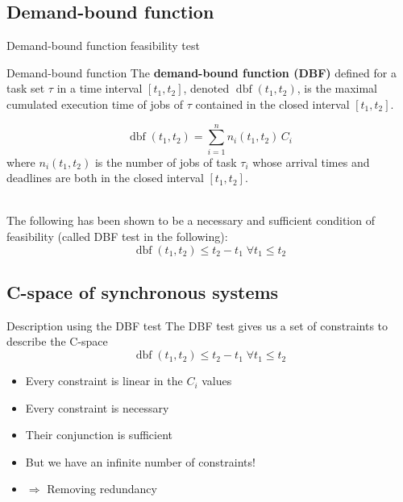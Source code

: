 \documentclass{beamer}
\newcommand{\dbf}[1]{\operatorname{dbf}(#1)}
\begin{document}
    \begin{frame}
    \end{frame}

    \subsection{Demand-bound function}

    \begin{frame}{Demand-bound function feasibility test}
        \begin{block}{Demand-bound function}
            The \textbf{demand-bound function (DBF)} \cite{baruah1999generalized,
        baruah1990algorithms}
            defined for a task set $\tau$ in a time interval $[t_1, t_2]$, denoted $\dbf{t_1, t_2}$, is
            the maximal cumulated execution time of jobs of $\tau$ contained in the
            closed interval $[t_1, t_2]$.
        \end{block}
        $$\dbf{t_1, t_2} = \sum_{i=1}^{n} n_i(t_1, t_2) \, C_i$$
        where $n_i(t_1, t_2)$ is the number of jobs of task $\tau_i$ whose arrival times
        and deadlines are both in the closed interval $[t_1, t_2]$.

        ~\\

        The following has been shown to be a necessary and sufficient condition of feasibility (called DBF test in the following): $$\dbf{t_1, t_2} \leqslant t_2 - t_1 \; \forall t_1 \leq t_2$$

    \end{frame}

    \subsection{C-space of synchronous systems}

    \begin{frame}{Description using the DBF test}
    The DBF test gives us a set of constraints to describe the C-space
    $$\dbf{t_1, t_2} \leqslant t_2 - t_1 \; \forall t_1 \leq t_2$$

    \begin{itemize}
        \item Every constraint is linear in the $C_i$ values
        \item Every constraint is necessary
        \item Their conjunction is sufficient
        \item But we have an infinite number of constraints!
        \item $\Rightarrow$ Removing redundancy
    \end{itemize}
    \end{frame}
\end{document}

